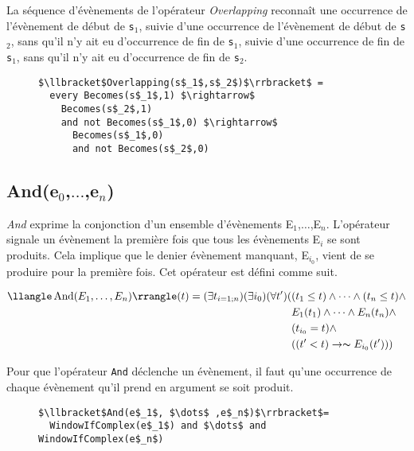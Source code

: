 La séquence d'évènements de l'opérateur {\em Overlapping} reconnaît une occurrence de l'évènement de début de {\tt s$_1$}, suivie d'une occurrence de l'évènement de début de {\tt s$_2$}, sans qu'il n'y ait eu d'occurrence de fin de {\tt s$_1$}, suivie d'une occurrence de fin de {\tt s$_1$}, sans qu'il n'y ait eu d'occurrence de fin de {\tt s$_2$}.
\begin{figure}
\begin{lstlisting}[language=EPLPseudoCodeCompile]
$\llbracket$Overlapping(s$_1$,s$_2$)$\rrbracket$ = 
  every Becomes(s$_1$,1) $\rightarrow$ 
    Becomes(s$_2$,1) 
    and not Becomes(s$_1$,0) $\rightarrow$ 
      Becomes(s$_1$,0) 
      and not Becomes(s$_2$,0) 
\end{lstlisting}
\end{figure}

\subsection*{And(e$_0$,$\dots$,e$_n$)}
{\em And} exprime la conjonction d'un ensemble d'évènements {E$_1$,$\dots$,E$_n$}. 
L'opérateur signale un évènement la première fois que tous les évènements E$_i$ se sont produits. 
Cela implique que le denier évènement manquant, E$_{i_0}$, vient de se produire pour la première fois.
Cet opérateur est défini comme suit.
\begin{small}
\begin{equation*}
\begin{split}
\llangle\operatorname{And}(E_1, \dots , E_n)\rrangle(t)=(\exists t_{i=1;n})(\exists i_0)(\forall t')(& (t_1\leq t)\wedge \dots \wedge (t_n\leq t) \wedge \\
& E_1(t_1)\wedge \dots \wedge E_n(t_n)\wedge \\
& (t_{i_0}=t) \wedge \\
&((t'<t)\rightarrow \thicksim E_{i_0}(t')))
\end{split}
\end{equation*}
\end{small}
Pour que l'opérateur {\tt And} déclenche un évènement, il faut qu'une occurrence de chaque évènement qu'il prend en argument se soit produit.
\begin{figure}
\begin{lstlisting}[language=EPLPseudoCodeCompile]
$\llbracket$And(e$_1$, $\dots$ ,e$_n$)$\rrbracket$=
  WindowIfComplex(e$_1$) and $\dots$ and WindowIfComplex(e$_n$)
\end{lstlisting}
\end{figure}

